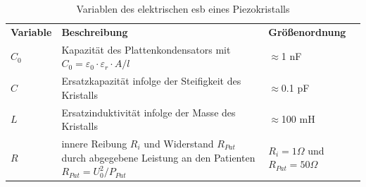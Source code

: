 \begin{table}[h!]
\centering
\caption{Variablen des elektrischen \acs{esb} eines Piezokristalls}
\label{tab:var_esb}
\begin{tabular}{l|p{10cm}|p{3cm}}
\textbf{Variable} & \textbf{Beschreibung} & \textbf{Größenordnung} \\
\cline{1-3}
$C_0$ 	& Kapazität des Plattenkondensators mit $C_0=\varepsilon_0\cdot \varepsilon_r\cdot A/l$ & $\approx$1 nF	 \\ 
$C$ 	& Ersatzkapazität infolge der Steifigkeit des Kristalls & $\approx$0.1 pF \\
$L$		& Ersatzinduktivität infolge der Masse des Kristalls & $\approx$100 mH \\
$R$		& innere Reibung $R_i$ und Widerstand $R_{Pat}$ durch abgegebene Leistung an den Patienten $R_{Pat}=U_0^2/P_{Pat}$  & $R_i=1 \Omega$ und $R_{Pat}=50\Omega$
\end{tabular}
\end{table}